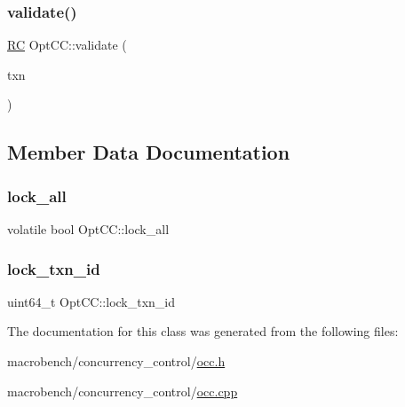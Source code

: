 \subsubsection{\texorpdfstring{validate()}{validate()}}
{\footnotesize\ttfamily \hyperlink{global_8h_a78c49a674c810fdd03d20432f7be864a}{RC} Opt\+C\+C\+::validate (\begin{DoxyParamCaption}\item[{\hyperlink{classtxn__man}{txn\+\_\+man} $\ast$}]{txn }\end{DoxyParamCaption})}



\subsection{Member Data Documentation}
\mbox{\label{classOptCC_a9c85846a4cd32e12561da6b0d056dc5b}} 
\subsubsection{\texorpdfstring{lock\+\_\+all}{lock\_all}}
{\footnotesize\ttfamily volatile bool Opt\+C\+C\+::lock\+\_\+all}

\mbox{\label{classOptCC_a3402f030762477a8467b2359d5444e82}} 
\subsubsection{\texorpdfstring{lock\+\_\+txn\+\_\+id}{lock\_txn\_id}}
{\footnotesize\ttfamily uint64\+\_\+t Opt\+C\+C\+::lock\+\_\+txn\+\_\+id}



The documentation for this class was generated from the following files\+:\begin{DoxyCompactItemize}
\item 
macrobench/concurrency\+\_\+control/\hyperlink{occ_8h}{occ.\+h}\item 
macrobench/concurrency\+\_\+control/\hyperlink{occ_8cpp}{occ.\+cpp}\end{DoxyCompactItemize}
